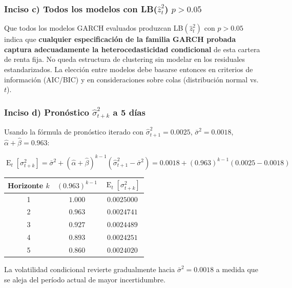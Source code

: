 \documentclass[12pt,a4paper]{article}
\DeclareMathOperator{\E}{E}
\begin{document}
\subsubsection*{Inciso c) Todos los modelos con LB($\hat{z}_t^2$) $p>0.05$}

\begin{solucion}
Que todos los modelos GARCH evaluados produzcan LB$(\hat{z}_t^2)$ con $p>0.05$ indica que \textbf{cualquier especificación de la familia GARCH probada captura adecuadamente la heterocedasticidad condicional} de esta cartera de renta fija. No queda estructura de clustering sin modelar en los residuales estandarizados. La elección entre modelos debe basarse entonces en criterios de información (AIC/BIC) y en consideraciones sobre colas (distribución normal vs.\ $t$).
\end{solucion}

\subsubsection*{Inciso d) Pronóstico $\hat{\sigma}_{t+k}^2$ a 5 días}

\begin{solucion}
Usando la fórmula de pronóstico iterado con $\hat{\sigma}_{t+1}^2=0.0025$, $\bar{\sigma}^2=0.0018$, $\hat{\alpha}+\hat{\beta}=0.963$:

\begin{equation}
\E_t[\sigma_{t+k}^2] = \bar{\sigma}^2 + (\hat{\alpha}+\hat{\beta})^{k-1}(\hat{\sigma}_{t+1}^2-\bar{\sigma}^2) = 0.0018 + (0.963)^{k-1}(0.0025-0.0018)
\end{equation}

\begin{center}
\begin{tabular}{ccc}
\toprule
Horizonte $k$ & $(0.963)^{k-1}$ & $\E_t[\sigma_{t+k}^2]$\\
\midrule
1 & $1.000$ & $0.0025000$\\
2 & $0.963$ & $0.0024741$\\
3 & $0.927$ & $0.0024489$\\
4 & $0.893$ & $0.0024251$\\
5 & $0.860$ & $0.0024020$\\
\bottomrule
\end{tabular}
\end{center}

La volatilidad condicional revierte gradualmente hacia $\bar{\sigma}^2=0.0018$ a medida que se aleja del período actual de mayor incertidumbre.
\end{solucion}
\end{document}
